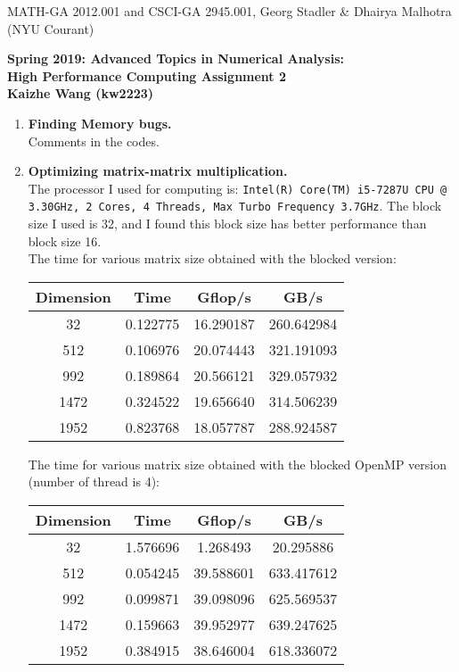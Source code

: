 \documentclass[12pt]{article}
\begin{document}
\begin{center}
  \vspace*{-2cm}
{\small MATH-GA 2012.001 and CSCI-GA 2945.001, Georg Stadler \&
  Dhairya Malhotra (NYU Courant)}
\end{center}
\vspace*{.5cm}
\begin{center}
\large \textbf{%
Spring 2019: Advanced Topics in Numerical Analysis: \\
High Performance Computing Assignment 2 \\
Kaizhe Wang (kw2223)}
\end{center}



\begin{enumerate}
 \item {\bf Finding Memory bugs.}   \\
 Comments in the codes.

  \item {\bf Optimizing matrix-matrix multiplication.} \\
  The processor I used for computing is: \texttt{Intel(R) Core(TM) i5-7287U CPU @ 3.30GHz, 2 Cores, 4 Threads, Max Turbo Frequency 3.7GHz}. The block size I used is 32, and I found this block size has better performance than block size 16. \\
  The time for various matrix size obtained with the blocked version:
  \begin{center}
\begin{tabular}{ |c|c|c|c| } 
 \hline
 Dimension    &   Time   & Gflop/s    &   GB/s\\
 \hline
        32   &0.122775  &16.290187 &260.642984\\
       512   &0.106976 & 20.074443 &321.191093\\
        992  & 0.189864  &20.566121 &329.057932\\
       1472 &  0.324522  &19.656640 &314.506239\\
       1952  & 0.823768 & 18.057787 & 288.924587\\
  \hline
\end{tabular}
\end{center}

The time for various matrix size obtained with the blocked OpenMP version (number of thread is 4): 
  \begin{center}
\begin{tabular}{ |c|c|c|c| } 
 \hline
 Dimension    &   Time   & Gflop/s    &   GB/s\\
 \hline
         32  & 1.576696  & 1.268493 & 20.295886\\
       512  & 0.054245 & 39.588601& 633.417612\\
        992  & 0.099871  &39.098096 &625.569537\\
       1472  & 0.159663 & 39.952977 &639.247625\\
       1952   &0.384915 & 38.646004 &618.336072\\
  \hline
\end{tabular}
\end{center}


\end{enumerate}
\end{document}
